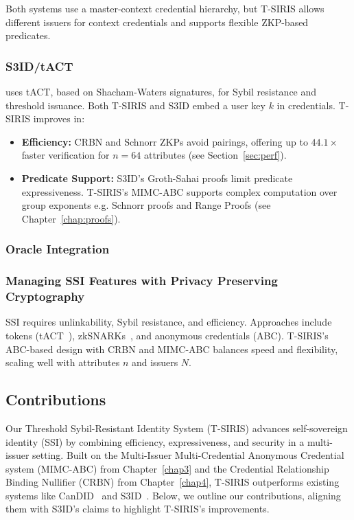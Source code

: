 Both systems use a master-context credential hierarchy, but T-SIRIS allows different issuers for context credentials and supports flexible ZKP-based predicates.

\subsubsection*{S3ID/tACT} \cite{rabaninejad_attribute-based_2024} uses tACT, based on Shacham-Waters signatures, for Sybil resistance and threshold issuance. Both T-SIRIS and S3ID embed a user key $k$ in credentials. T-SIRIS improves in:
\begin{itemize}
    \item \textbf{Efficiency:} CRBN and Schnorr ZKPs avoid pairings, offering up to $44.1\times$ faster verification for $n=64$ attributes (see Section~\ref{sec:perf}).
    \item \textbf{Predicate Support:} S3ID’s Groth-Sahai proofs limit predicate expressiveness. T-SIRIS’s MIMC-ABC supports complex computation over group exponents e.g. Schnorr proofs and Range Proofs (see Chapter~\ref{chap:proofs}).
\end{itemize}

\subsubsection*{Oracle Integration}


\subsubsection*{Managing SSI Features with Privacy Preserving Cryptography}
SSI requires unlinkability, Sybil resistance, and efficiency. Approaches include tokens (tACT~\cite{rabaninejad_attribute-based_2024}), zkSNARKs~\cite{rosenberg_zk-creds_2022}, and anonymous credentials (ABC). T-SIRIS’s ABC-based design with CRBN and MIMC-ABC balances speed and flexibility, scaling well with attributes $n$ and issuers $N$.


\subsection{Contributions}
\label{sec:tsiris_contributions}

Our Threshold Sybil-Resistant Identity System (T-SIRIS) advances self-sovereign identity (SSI) by combining efficiency, expressiveness, and security in a multi-issuer setting. Built on the Multi-Issuer Multi-Credential Anonymous Credential system (MIMC-ABC) from Chapter~\ref{chap3} and the Credential Relationship Binding Nullifier (CRBN) from Chapter~\ref{chap4}, T-SIRIS outperforms existing systems like CanDID~\cite{maram2021candid} and S3ID~\cite{rabaninejad_attribute-based_2024}. Below, we outline our contributions, aligning them with S3ID’s claims to highlight T-SIRIS’s improvements.

